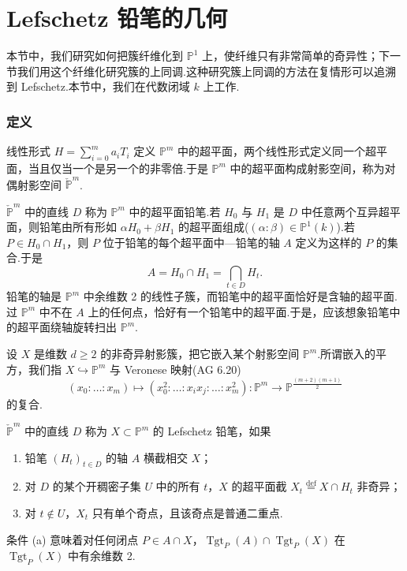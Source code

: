 ﻿%
\chapter{Lefschetz 铅笔的几何}\label{sec:31}

本节中，我们研究如何把簇纤维化到 $\mathbb{P}^{1}$ 上，使纤维只有非常简单的奇异性；下一节我们用这个纤维化研究簇的上同调.这种研究簇上同调的方法在复情形可以追溯到 Lefschetz.本节中，我们在代数闭域 $k$ 上工作.

\subsection*{定义}

线性形式 $H = \sum_{i=0}^{m} a_i T_i$ 定义 $\mathbb{P}^{m}$ 中的超平面，两个线性形式定义同一个超平面，当且仅当一个是另一个的非零倍.于是 $\mathbb{P}^{m}$ 中的超平面构成射影空间，称为对偶射影空间 $\check{\mathbb{P}}^{m}$.

$\check{\mathbb{P}}^{m}$ 中的直线 $D$ 称为 $\mathbb{P}^{m}$ 中的超平面铅笔.若 $H_0$ 与 $H_1$ 是 $D$ 中任意两个互异超平面，则铅笔由所有形如 $\alpha H_0 + \beta H_1$ 的超平面组成($(\alpha \colon \beta) \in \mathbb{P}^{1}(k)$).若 $P \in H_0 \cap H_1$，则 $P$ 位于铅笔的每个超平面中---铅笔的轴 $A$ 定义为这样的 $P$ 的集合.于是
\[
A = H_0 \cap H_1 = \bigcap_{t \in D} H_t.
\]
铅笔的轴是 $\mathbb{P}^{m}$ 中余维数 2 的线性子簇，而铅笔中的超平面恰好是含轴的超平面.过 $\mathbb{P}^{m}$ 中不在 $A$ 上的任何点，恰好有一个铅笔中的超平面.于是，应该想象铅笔中的超平面绕轴旋转扫出 $\mathbb{P}^{m}$.

设 $X$ 是维数 $d \geq 2$ 的非奇异射影簇，把它嵌入某个射影空间 $\mathbb{P}^{m}$.所谓嵌入的平方，我们指 $X \hookrightarrow \mathbb{P}^{m}$ 与 Veronese 映射(AG 6.20)
\[
(x_0 \colon \ldots \colon x_m) \mapsto (x^{2}_0 \colon \ldots \colon x_i x_j \colon \ldots \colon x^{2}_m) \colon \mathbb{P}^{m} \to \mathbb{P}^{\frac{(m+2)(m+1)}{2}}
\]
的复合.

\begin{definition}\label{def:31.1}
$\check{\mathbb{P}}^{m}$ 中的直线 $D$ 称为 $X \subset \mathbb{P}^{m}$ 的 Lefschetz 铅笔，如果
\begin{enumerate}
  \item 铅笔 $(H_t)_{t \in D}$ 的轴 $A$ 横截相交 $X$；
  \item 对 $D$ 的某个开稠密子集 $U$ 中的所有 $t$，$X$ 的超平面截 $X_t \overset{\mathrm{def}}{=} X \cap H_t$ 非奇异；
  \item 对 $t \notin U$，$X_t$ 只有单个奇点，且该奇点是普通二重点.
\end{enumerate}
条件 (a) 意味着对任何闭点 $P \in A \cap X$，$\operatorname{Tgt}_{P}(A) \cap \operatorname{Tgt}_{P}(X)$ 在 $\operatorname{Tgt}_{P}(X)$ 中有余维数 2.
\end{definition}

